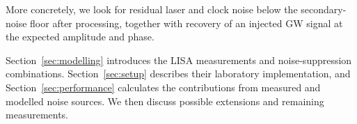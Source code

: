 More concretely, we look for residual laser and clock noise below the secondary-noise floor after processing, together with recovery of an injected GW signal at the expected amplitude and phase.

Section~\ref{sec:modelling} introduces the LISA measurements and noise-suppression combinations. Section~\ref{sec:setup} describes their laboratory implementation, and Section~\ref{sec:performance} calculates the contributions from measured and modelled noise sources. We then discuss possible extensions and remaining measurements.
